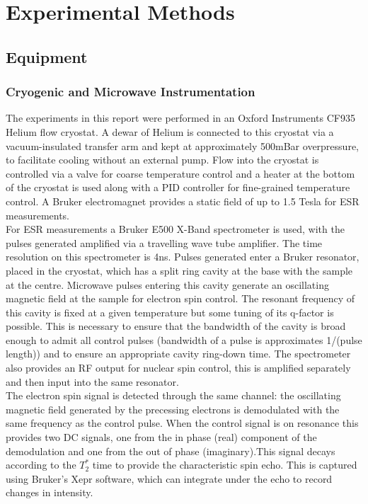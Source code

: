\chapter{Experimental Methods}


\section{Equipment}
\subsection{Cryogenic and Microwave Instrumentation}

The experiments in this report were performed in an Oxford Instruments CF935 Helium flow cryostat.
A dewar of Helium is connected to this cryostat via a vacuum-insulated transfer arm and kept at approximately 500mBar overpressure, to facilitate cooling without an external pump.
Flow into the cryostat is controlled via a valve for coarse temperature control and a heater at the bottom of the cryostat is used along with a PID controller for fine-grained temperature control.
A Bruker electromagnet provides a static field of up to 1.5 Tesla for ESR measurements.
\\
For ESR measurements a Bruker E500 X-Band spectrometer is used, with the pulses generated amplified via a travelling wave tube amplifier.
The time resolution on this spectrometer is 4ns.
Pulses generated enter a Bruker resonator, placed in the cryostat, which has a split ring cavity at the base with the sample at the centre.
Microwave pulses entering this cavity generate an oscillating magnetic field at the sample for electron spin control. 
The resonant frequency of this cavity is fixed at a given temperature but some tuning of its q-factor is possible.
This is necessary to ensure that the bandwidth of the cavity is broad enough to admit all control pulses (bandwidth of a pulse is approximates 1/(pulse length)) and to ensure an appropriate cavity ring-down time.
The spectrometer also provides an RF output for nuclear spin control, this is amplified separately and then input into the same resonator.
\\
The electron spin signal is detected through the same channel: the oscillating magnetic field generated by the precessing electrons is demodulated with the same frequency as the control pulse.
When the control signal is on resonance this provides two DC signals, one from the in phase (real) component of the demodulation and one from the out of phase (imaginary).This signal decays according to the $T_2^*$ time to provide the characteristic spin echo.
This is captured using Bruker's Xepr software, which can integrate under the echo to record changes in intensity.

